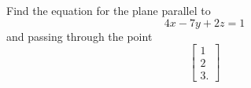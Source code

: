 Find the equation for the plane parallel to 
\[
4x-7y+2z=1
\]
and passing through the point
\[
\begin{bmatrix}
1 \\ 2 \\ 3.
\end{bmatrix}
\]